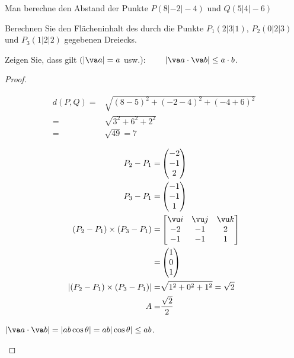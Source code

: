 \begin{Problem}
	\begin{parts}
		\item Man berechne den Abstand der Punkte $P (8| - 2| - 4)$ und $Q(5|4| - 6)$
		\item Berechnen Sie den Fl\"{a}cheninhalt des durch die Punkte $P_1(2|3|1)$, $P_2(0|2|3)$ und $P_3(1|2|2)$ gegebenen Dreiecks.
		\item Zeigen Sie, dass gilt $(|\va a|=a$ usw.): $\qquad \left| \va a \cdot \va b \right| \le a \cdot b$.
	\end{parts}
\end{Problem}
\begin{proof}
	\begin{parts}
		\item
	\begin{align*}
		d(P, Q)=&\sqrt{(8-5)^2+(-2-4)^2+(-4+6)^2}\\
		=& \sqrt{3^2+6^2+2^2}\\
		=&\sqrt{49} =7
	\end{align*}
\item
	{\allowdisplaybreaks
	\begin{align*}
		P_2-P_1=&\begin{pmatrix} -2 \\ -1 \\ 2 \end{pmatrix} \\
		P_3-P_1=& \begin{pmatrix} -1 \\ -1 \\ 1 \end{pmatrix}\\
		(P_2-P_1)\times (P_3-P_1)=&\begin{bmatrix} \vu i & \vu j & \vu k \\ -2 & -1 & 2 \\ -1 & -1 & 1 \end{bmatrix} \\
		=& \begin{pmatrix} 1 \\ 0 \\ 1 \end{pmatrix}\\
		|(P_2-P_1)\times (P_3-P_1)|=& \sqrt{1^2+0^2+1^2} =\sqrt{2}\\
		A=& \frac{\sqrt{2} }{2}
\end{align*}}
\item $|\va a \cdot \va b|=|ab\cos\theta|=ab|\cos\theta| \le ab$. \qedhere
	\end{parts}
\end{proof}

